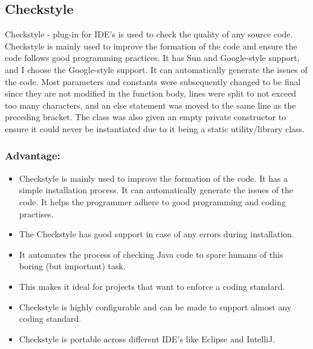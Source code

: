 \documentclass[letterpaper, 11pt]{article}
\begin{document}
    \subsection{Checkstyle} 
    Checkstyle - plug-in for IDE's is used to check the quality of any source code. Checkstyle is mainly used to improve the formation of the code and ensure the code follows good programming practices. It has Sun and Google-style support, and I choose the Google-style support. It can automatically generate the issues of the code. Most parameters and constants were subsequently changed to be final since they are not modified in the function body, lines were split to not exceed too many characters, and an else statement was moved to the same line as the preceding bracket. The class was also given an empty private constructor to ensure it could never be instantiated due to it being a static utility/library class.\cite{Checkstyle}
    \subsubsection{\textbf{Advantage:} }
    \begin{itemize}
        \item Checkstyle is mainly used to improve the formation of the code. It has a simple installation process. It can automatically generate the issues of the code. It helps the programmer adhere to good programming and coding practises.
        \item The Checkstyle has good support in case of any errors during installation. 
        \item It automates the process of checking Java code to spare humans of this boring (but important) task.
        \item This makes it ideal for projects that want to enforce a coding standard.
        \item Checkstyle is highly configurable and can be made to support almost any coding standard.
        \item Checkstyle is portable across different IDE's like Eclipse and IntelliJ.
    \end{itemize}
\end{document}

